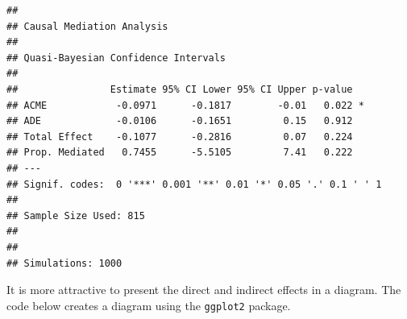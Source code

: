 \documentclass[doc,floatsintext]{apa6}
\begin{document}
\begin{verbatim}
## 
## Causal Mediation Analysis 
## 
## Quasi-Bayesian Confidence Intervals
## 
##                Estimate 95% CI Lower 95% CI Upper p-value  
## ACME            -0.0971      -0.1817        -0.01   0.022 *
## ADE             -0.0106      -0.1651         0.15   0.912  
## Total Effect    -0.1077      -0.2816         0.07   0.224  
## Prop. Mediated   0.7455      -5.5105         7.41   0.222  
## ---
## Signif. codes:  0 '***' 0.001 '**' 0.01 '*' 0.05 '.' 0.1 ' ' 1
## 
## Sample Size Used: 815 
## 
## 
## Simulations: 1000
\end{verbatim}

It is more attractive to present the direct and indirect effects in a
diagram. The code below creates a diagram using the \texttt{ggplot2}
package.
\end{document}
